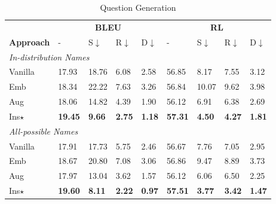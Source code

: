 \begin{table}[h!]
	\begin{subtable}{\linewidth}
		\scriptsize
		\centering
		\begin{tabular}{p{0.9cm}|p{0.36cm}p{0.36cm}p{0.36cm}p{0.36cm}|p{0.36cm}p{0.36cm}p{0.36cm}p{0.36cm}}
			\toprule[1pt]
			 & \multicolumn{4}{c|}{\textbf{BLEU}} & \multicolumn{4}{c}{\textbf{RL}} \\
			\textbf{Approach}& - & S$\downarrow$  & R$\downarrow$ & D$\downarrow$& - & S$\downarrow$  & R$\downarrow$& D$\downarrow$ \\
			
			\hline
			\multicolumn{7}{l}{\textit{In-distribution Names}}\\
			Vanilla &
			17.93& 18.76& 6.08& 2.58&{56.85} &8.17&7.55& 3.12 \\
			Emb  & 18.34 &22.22 & 7.63 & 3.26 &56.84 & 10.07 & 9.62 & 3.98\\
			Aug &
			18.06 & 14.82 & {4.39} & {1.90} &56.12 &6.91 & {6.38} & 2.69 \\
			Ins$\star$ & \textbf{19.45} &\textbf{9.66}  & \textbf{2.75} & \textbf{1.18}& \textbf{57.31}&\textbf{4.50}& \textbf{4.27} & \textbf{1.81} \\
			
			\hline
			\multicolumn{7}{l}{\textit{All-possible Names}}\\
			Vanilla &
			17.91& 17.73& 5.75 & 2.46&56.67 & 7.76&7.05 & 2.95\\
			Emb  & 18.67 & 20.80  & 7.08& 3.06&56.86& 9.47& 8.89 & 3.73 \\
			Aug  &
			17.97 & 13.04 & {3.62} & {1.57} &56.12&6.06& {6.50}& {2.25}  \\
			Ins$\star$& \textbf{19.60} & \textbf{8.11} & \textbf{2.22} & \textbf{0.97}& \textbf{57.51}&\textbf{3.77}& \textbf{3.42}& \textbf{1.47} \\

			\bottomrule[1pt]
		\end{tabular}
		\caption{Question Generation}
	\end{subtable}
	

\end{table}
